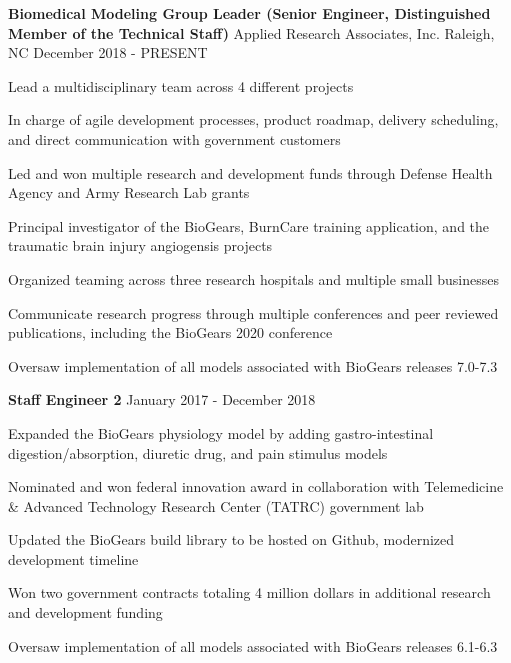 
\begin{cventries}
  \cventry
    {\textbf{Biomedical Modeling Group Leader (Senior Engineer, Distinguished Member of the Technical Staff)}} %
    {Applied Research Associates, Inc.} %
    {Raleigh, NC} %
    {December 2018 - PRESENT} %
    {
      \begin{cvitems} %
        \item {Lead a multidisciplinary team across 4 different projects}
        \item {In charge of agile development processes, product roadmap, delivery scheduling, and direct communication with government customers}
        \item {Led and won multiple research and development funds through Defense Health Agency and Army Research Lab grants}
        \item {Principal investigator of the BioGears, BurnCare training application, and the traumatic brain injury angiogensis projects}
        \item {Organized teaming across three research hospitals and multiple small businesses}
        \item {Communicate research progress through multiple conferences and peer reviewed publications, including the BioGears 2020 conference}
        \item {Oversaw implementation of all models associated with BioGears releases 7.0-7.3}
      \end{cvitems}
    }

  \cventry
    {\textbf{Staff Engineer 2}} %
    {} %
    {} %
    {January 2017 - December 2018} %
    {
      \begin{cvitems} %
        \item {Expanded the BioGears physiology model by adding gastro-intestinal digestion/absorption, diuretic drug, and pain stimulus models}
        \item {Nominated and won federal innovation award in collaboration with Telemedicine \& Advanced Technology Research Center (TATRC) government lab}
        \item {Updated the BioGears build library to be hosted on Github, modernized development timeline}
        \item {Won two government contracts totaling 4 million dollars in additional research and development funding}
        \item {Oversaw implementation of all models associated with BioGears releases 6.1-6.3}
      \end{cvitems}
    }


\end{cventries}
